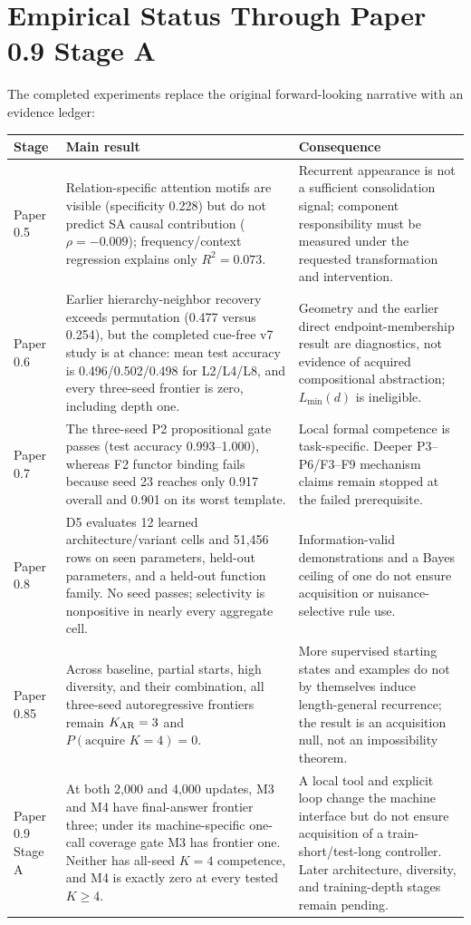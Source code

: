 \documentclass[11pt]{article}
\begin{document}
\section{Empirical Status Through Paper 0.9 Stage A}
The completed experiments replace the original forward-looking narrative with an evidence ledger:
\begin{table}[H]\centering\small
\begin{tabularx}{\linewidth}{p{.14\linewidth}X X}\toprule
Stage & Main result & Consequence\\\midrule
Paper 0.5 & Relation-specific attention motifs are visible (specificity 0.228) but do not predict SA causal contribution ($\rho=-0.009$); frequency/context regression explains only $R^2=0.073$. & Recurrent appearance is not a sufficient consolidation signal; component responsibility must be measured under the requested transformation and intervention.\\
Paper 0.6 & Earlier hierarchy-neighbor recovery exceeds permutation (0.477 versus 0.254), but the completed cue-free v7 study is at chance: mean test accuracy is 0.496/0.502/0.498 for L2/L4/L8, and every three-seed frontier is zero, including depth one. & Geometry and the earlier direct endpoint-membership result are diagnostics, not evidence of acquired compositional abstraction; $L_{\min}(d)$ is ineligible.\\
Paper 0.7 & The three-seed P2 propositional gate passes (test accuracy 0.993--1.000), whereas F2 functor binding fails because seed 23 reaches only 0.917 overall and 0.901 on its worst template. & Local formal competence is task-specific. Deeper P3--P6/F3--F9 mechanism claims remain stopped at the failed prerequisite.\\
Paper 0.8 & D5 evaluates 12 learned architecture/variant cells and 51,456 rows on seen parameters, held-out parameters, and a held-out function family. No seed passes; selectivity is nonpositive in nearly every aggregate cell. & Information-valid demonstrations and a Bayes ceiling of one do not ensure acquisition or nuisance-selective rule use.\\
Paper 0.85 & Across baseline, partial starts, high diversity, and their combination, all three-seed autoregressive frontiers remain $K_{\rm AR}=3$ and $P(\text{acquire }K=4)=0$. & More supervised starting states and examples do not by themselves induce length-general recurrence; the result is an acquisition null, not an impossibility theorem.\\
Paper 0.9 Stage A & At both 2,000 and 4,000 updates, M3 and M4 have final-answer frontier three; under its machine-specific one-call coverage gate M3 has frontier one. Neither has all-seed $K=4$ competence, and M4 is exactly zero at every tested $K\ge4$. & A local tool and explicit loop change the machine interface but do not ensure acquisition of a train-short/test-long controller. Later architecture, diversity, and training-depth stages remain pending.\\

\end{tabularx}
\end{table}
\end{document}
